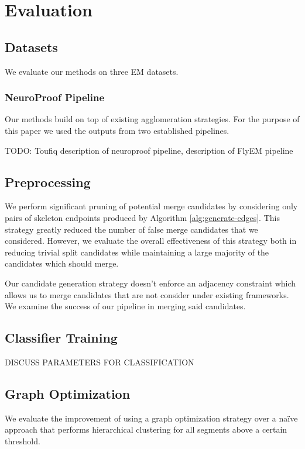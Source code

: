 \section{Evaluation}

\subsection{Datasets}

We evaluate our methods on three EM datasets. 

\subsubsection{NeuroProof Pipeline}

Our methods build on top of existing agglomeration strategies. For the purpose of this paper we used the outputs from two established pipelines. 

TODO: Toufiq description of neuroproof pipeline, description of FlyEM pipeline

\subsection{Preprocessing}

We perform significant pruning of potential merge candidates by considering only pairs of skeleton endpoints produced by Algorithm \ref{alg:generate-edges}. This strategy greatly reduced the number of false merge candidates that we considered. However, we evaluate the overall effectiveness of this strategy both in reducing trivial split candidates while maintaining a large majority of the candidates which should merge.

Our candidate generation strategy doesn't enforce an adjacency constraint which allows us to merge candidates that are not consider under existing frameworks. We examine the success of our pipeline in merging said candidates. 

\subsection{Classifier Training}

DISCUSS PARAMETERS FOR CLASSIFICATION

\subsection{Graph Optimization}

We evaluate the improvement of using a graph optimization strategy over a na\"ive approach that performs hierarchical clustering for all segments above a certain threshold. 